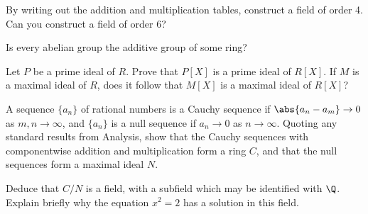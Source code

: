 \begin{problem}
By writing out the addition and multiplication tables, construct a field of order 4. Can you construct a field of order 6?
\end{problem}

\begin{solution}[\bf Solution.]

\end{solution}


\begin{problem}
Is every abelian group the additive group of some ring?
\end{problem}

\begin{solution}[\bf Solution.]

\end{solution}



\begin{problem}
Let $P$ be a prime ideal of $R$. Prove that $P[X]$ is a prime ideal of $R[X]$. If $M$ is a maximal ideal of $R$, does it follow that $M[X]$ is a maximal ideal of $R[X]$?
\end{problem}

\begin{solution}[\bf Solution.]

\end{solution}



\begin{problem}
A sequence $\{a_n\}$ of rational numbers is a Cauchy sequence if $\abs{a_n -a_m} \to 0$ as $m, n \to\infty$, and $\{a_n\}$ is a null sequence if $a_n \to 0$ as $n \to \infty$. Quoting any standard results from Analysis, show that the Cauchy sequences with componentwise addition and multiplication form a ring $C$, and that the null sequences form a maximal ideal $N$.

Deduce that $C/N$ is a field, with a subfield which may be identified with $\Q$. Explain briefly why the equation $x^2 = 2$ has a solution in this field.
\end{problem}

